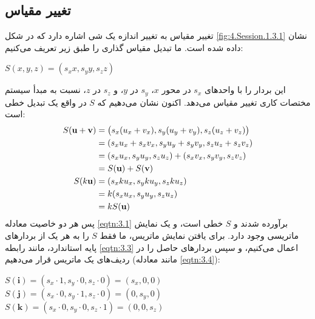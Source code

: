 \subsection{\textbf{تغییر مقیاس}}
\label{subsec:3.1.3}
{
    \Large
    \begin{spacing}{1.5}
        تغییر مقیاس به تغییر اندازه یک شی اشاره دارد که در شکل \ref{fig:4.Session.1.3.1} نشان داده شده است.
        ما تبدیل مقیاس گذاری را طبق زیر تعریف می‌کنیم:

        \begin{center}
            $S(x,y,z)=(s_{x}x,s_{y}y,s_{z}z)$
        \end{center}

        این بردار را با واحدهای $s_x$ در محور $x$، $s_y$ در $y$، و $s_z$ در $z$،
        نسبت به مبدأ سیستم مختصات کاری تغییر مقیاس می‌دهد.
        اکنون نشان می‌دهیم که $S$ در واقع یک تبدیل خطی است:
        \textbf{\vspace{-20pt}}
        \begin{equation*}
            \centering
            \begin{split}
                S(\textbf{u}+\textbf{v})&=\left( s_{x}(u_{x}+v_{x}), s_{y}(u_{y}+v_{y}), s_{z}(u_{z}+v_{z}) \right) \\
                &=(s_{x}u_{x}+s_{x}v_{x}, s_{y}u_{y}+s_{y}v_{y}, s_{z}u_{z}+s_{z}v_{z}) \\
                &=(s_{x}u_{x}, s_{y}u_{y}, s_{z}u_{z})+(s_{x}v_{x}, s_{y}v_{y}, s_{z}v_{z}) \\
                &=S(\textbf{u})+S(\textbf{v}) \\
                S(k\textbf{u})&=(s_{x}ku_{x}, s_{y}ku_{y}, s_{z}ku_{z}) \\
                &=k(s_{x}u_{x}, s_{y}u_{y}, s_{z}u_{z}) \\
                &=kS(\textbf{u}) \\
            \end{split}
        \end{equation*}
        پس هر دو خاصیت معادله \ref{eqtn:3.1} برآورده شدند و $S$ خطی است،
        و یک نمایش ماتریسی وجود دارد. برای یافتن نمایش ماتریس، ما فقط $S$ را به هر یک از بردارهای پایه استاندارد، مانند رابطه \ref{eqtn:3.3} اعمال می‌کنیم،
        و سپس بردارهای حاصل را در ردیف‌های یک ماتریس قرار می‌دهیم (مانند معادله \ref{eqtn:3.4}):

        \begin{center}
            $S(\textbf{i})=(s_x\cdot 1,s_y\cdot 0,s_z\cdot 0)=(s_x,0,0)$ \\
            $S(\textbf{j})=(s_x\cdot 0,s_y\cdot 1,s_z\cdot 0)=(0,s_y,0)$ \\
            $S(\textbf{k})=(s_x\cdot 0,s_y\cdot 0,s_z\cdot 1)=(0,0,s_z)$
        \end{center}


\end{spacing}}
